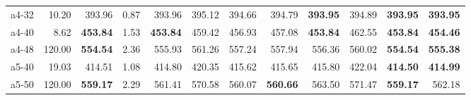 \documentclass[aspectratio=1610]{beamer}
\begin{document}
\begin{frame}
\begin{table}[]
{\begin{tabular}{lrrrrrrrrrrr}
a4-32                                          & 10.20                                                   & \multicolumn{1}{r|}{393.96}          & 0.87                                                         & 393.96          & \multicolumn{1}{r|}{395.12}                                 & 394.66              & \multicolumn{1}{r|}{394.79}                                    & \textbf{393.95}   & \multicolumn{1}{r|}{394.89}                                  & \textbf{393.95}               & {\color[HTML]{FE0000} \textbf{393.95}}               \\
a4-40                                          & 8.62                                                    & \multicolumn{1}{r|}{\textbf{453.84}} & 1.53                                                         & \textbf{453.84} & \multicolumn{1}{r|}{459.42}                                 & 456.93              & \multicolumn{1}{r|}{457.08}                                    & \textbf{453.84}   & \multicolumn{1}{r|}{462.55}                                  & \textbf{453.84}               & {\color[HTML]{FE0000} \textbf{454.46}}               \\
a4-48                                          & 120.00                                                  & \multicolumn{1}{r|}{\textbf{554.54}} & 2.36                                                         & 555.93          & \multicolumn{1}{r|}{561.26}                                 & 557.24              & \multicolumn{1}{r|}{557.94}                                    & 556.36            & \multicolumn{1}{r|}{560.02}                                  & \textbf{554.54}               & {\color[HTML]{FE0000} \textbf{555.38}}               \\
a5-40                                          & 19.03                                                   & \multicolumn{1}{r|}{414.51}          & 1.08                                                         & 414.80          & \multicolumn{1}{r|}{420.35}                                 & 415.62              & \multicolumn{1}{r|}{415.65}                                    & 415.80            & \multicolumn{1}{r|}{422.04}                                  & \textbf{414.50}               & {\color[HTML]{FE0000} \textbf{414.99}}               \\
a5-50                                          & 120.00                                                  & \multicolumn{1}{r|}{\textbf{559.17}} & 2.29                                                         & 561.41          & \multicolumn{1}{r|}{570.58}                                 & 560.07              & \multicolumn{1}{r|}{{\color[HTML]{FE0000} \textbf{560.66}}}    & 563.50            & \multicolumn{1}{r|}{571.47}                                  & \textbf{559.17}               & 562.18                                               \\ \hline

\end{tabular}}
\end{table}
\end{frame}
\end{document}
